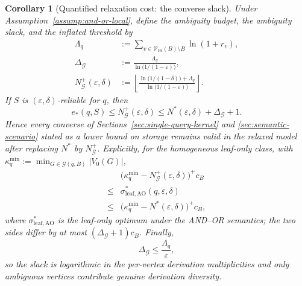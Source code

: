 \documentclass[journal]{IEEEtran}
\newtheorem{corollary}{Corollary}[section]
\numberwithin{equation}{section}
\begin{document}
\begin{corollary}[Quantified relaxation cost: the converse slack]
\label{cor:envelope-relaxation-cost}
Under Assumption~\ref{assump:and-or-local}, define the ambiguity budget, the
ambiguity slack, and the inflated threshold by
\begin{align}
  \Lambda_q
  &:=
  \sum_{v\in\mathcal V_{\mathrm{rel}}(B)\setminus B}\ln(1+r_v),\nonumber\\
  \Delta_{\mathcal G}
  &:=
  \frac{\Lambda_q}{\ln\!\bigl(1/(1-\varepsilon)\bigr)},
  \nonumber\\
  N^+_{\mathcal G}(\varepsilon,\delta)
  &:=
  \left\lfloor
    \frac{
      \ln\!\bigl(1/(1-\delta)\bigr)+\Lambda_q
    }{
      \ln\!\bigl(1/(1-\varepsilon)\bigr)
    }
  \right\rfloor .
\label{eq:envelope-N-plus}
\end{align}
If \(S\) is \((\varepsilon,\delta)\)-reliable for \(q\), then
\begin{equation}
  e_*(q,S)
  \le
  N^+_{\mathcal G}(\varepsilon,\delta)
  \le
  N^*(\varepsilon,\delta)+\Delta_{\mathcal G}+1.
\label{eq:envelope-converse}
\end{equation}
Hence every converse of Sections~\ref{sec:single-query-kernel} and
\ref{sec:semantic-scenario} stated as a lower bound on storage remains valid
in the relaxed model after replacing \(N^*\) by \(N^+_{\mathcal G}\).
Explicitly, for the homogeneous leaf-only class, with
\(\kappa_q^{\min}:=\min_{G\in\mathcal G(q,B)}|V_0(G)|\),
\begin{equation}
  \begin{aligned}
    & \bigl(\kappa_q^{\min}-N^+_{\mathcal G}(\varepsilon,\delta)\bigr)^+ c_B \\
    \le &\sigma_{\mathrm{leaf,AO}}^{*}(q,\varepsilon,\delta) \\
    \le &\bigl(\kappa_q^{\min}-N^*(\varepsilon,\delta)\bigr)^+ c_B,
  \end{aligned}
\label{eq:envelope-leaf-sandwich}
\end{equation}
where \(\sigma_{\mathrm{leaf,AO}}^{*}\) is the leaf-only optimum under the
AND--OR semantics; the two sides differ by at most
\((\Delta_{\mathcal G}+1)c_B\).  Finally,
\begin{equation}
  \Delta_{\mathcal G}
  \le
  \frac{\Lambda_q}{\varepsilon},
\label{eq:envelope-slack-bound}
\end{equation}
so the slack is logarithmic in the per-vertex derivation multiplicities and
only ambiguous vertices contribute genuine derivation diversity.
\end{corollary}
\end{document}
